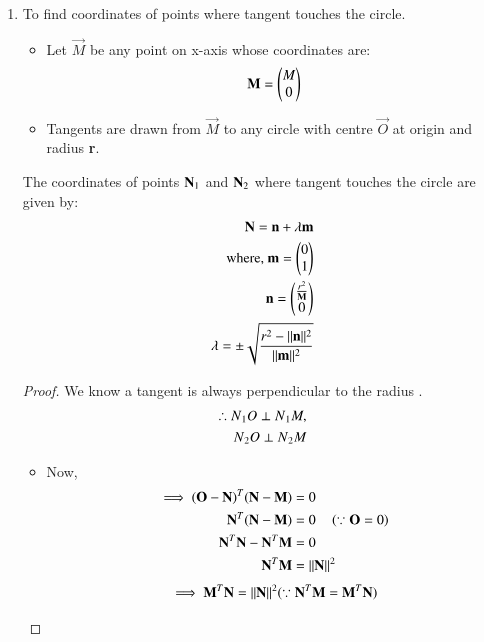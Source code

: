 \documentclass[journal,12pt,twocolumn]{IEEEtran}
\begin{document}
\begin{enumerate}
    \item To find coordinates of points where tangent touches the circle.
\begin{itemize}
    \item Let $\vec{M}$ be any point on x-axis whose coordinates are:
    \begin{align}
    \vec{M} =\myvec{M \\0} \label{eq1}
    \end{align}
    \item Tangents are drawn from $\vec{M}$ to any circle with centre $\vec{O}$ at origin and radius \textbf{r}.
\end{itemize}
\begin{lemma}
\label{lemma}
The coordinates of points $\vec{N\textsubscript{1}}$ and $\vec{N\textsubscript{2}}$ where tangent touches the circle are given by:
\begin{align}
\vec{N}=\vec{n}+\lambda \vec{m} \label{eq2}
\\
\text{where, }\vec{m}=\myvec{0\\1} 
\\
\vec{n}=\myvec{\frac{r^2}{\vec{M}}\\0}
\\
\lambda = \pm\sqrt{\frac{r^2-\norm{\vec{n}}^2}{\norm{\vec{m}}^2}}
\end{align}
\end{lemma}
\begin{proof}
We know a tangent is always perpendicular to the radius .
\begin{align}
\therefore N\textsubscript{1}O \perp N\textsubscript{1}M, 
\\
N\textsubscript{2}O \perp N\textsubscript{2}M
\end{align}
\begin{itemize}
\item Now,
\begin{align}
 \implies (\vec{O}-\vec{N})^T (\vec{N}-\vec{M}) &= 0
 \\
 \vec{N}^T(\vec{N}-\vec{M})&= 0 \quad \brak{\because \vec{O}=0}
 \\
  \vec{N}^T \vec{N} - \vec{N}^T \vec{M} &= 0  
  \\
   \vec{N}^T \vec{M} &=\norm{\vec{N}}^2
  \end{align}
 \begin{align}
  \implies\vec{M}^T \vec{N} =\norm{\vec{N}}^2 (\because \vec{N}^T \vec{M}=\vec{M}^T \vec{N}) 
 \end{align}

\end{itemize}
\end{proof}
\end{enumerate}
\end{document}
